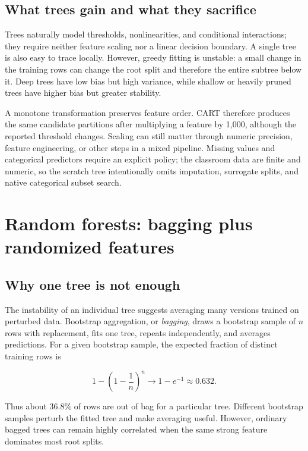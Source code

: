 \documentclass[11pt]{article}
\begin{document}
\subsection{What trees gain and what they sacrifice}

Trees naturally model thresholds, nonlinearities, and conditional interactions;
they require neither feature scaling nor a linear decision boundary. A single
tree is also easy to trace locally. However, greedy fitting is unstable: a small
change in the training rows can change the root split and therefore the entire
subtree below it. Deep trees have low bias but high variance, while shallow or
heavily pruned trees have higher bias but greater stability.

A monotone transformation preserves feature order. CART therefore produces the
same candidate partitions after multiplying a feature by 1,000, although the
reported threshold changes. Scaling can still matter through numeric precision,
feature engineering, or other steps in a mixed pipeline. Missing values and
categorical predictors require an explicit policy; the classroom data are
finite and numeric, so the scratch tree intentionally omits imputation,
surrogate splits, and native categorical subset search.

\section{Random forests: bagging plus randomized features}

\subsection{Why one tree is not enough}

The instability of an individual tree suggests averaging many versions trained
on perturbed data. Bootstrap aggregation, or \emph{bagging}, draws a bootstrap
sample of $n$ rows with replacement, fits one tree, repeats independently, and
averages predictions. For a given bootstrap sample, the expected fraction of
distinct training rows is

\[
 1-\left(1-\frac1n\right)^n\longrightarrow 1-e^{-1}\approx 0.632.
\]

Thus about $36.8\%$ of rows are out of bag for a particular tree. Different
bootstrap samples perturb the fitted tree and make averaging useful. However,
ordinary bagged trees can remain highly correlated when the same strong feature
dominates most root splits.
\end{document}
